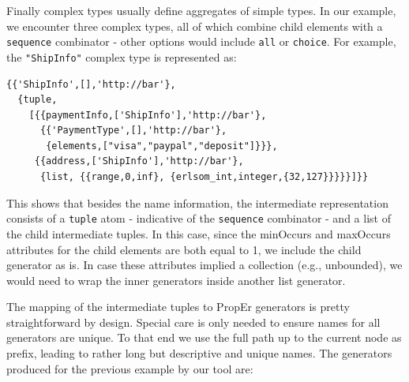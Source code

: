 \documentclass[submission,copyright]{eptcs}
\begin{document}
Finally complex types usually define aggregates of simple types. In
our example, we encounter three complex types, all of which combine
child elements with a \texttt{sequence} combinator - other options
would include \texttt{all} or \texttt{choice}. For example, the
\texttt{"ShipInfo"} complex type is represented as:

\begin{lstlisting}
{{'ShipInfo',[],'http://bar'},
  {tuple,
    [{{paymentInfo,['ShipInfo'],'http://bar'},
      {{'PaymentType',[],'http://bar'},
       {elements,["visa","paypal","deposit"]}}},
     {{address,['ShipInfo'],'http://bar'},
      {list, {{range,0,inf}, {erlsom_int,integer,{32,127}}}}}]}}
\end{lstlisting}

This shows that besides the name information, the intermediate representation consists of a 
\texttt{tuple} atom - indicative of the \texttt{sequence} combinator - and a list of the 
child intermediate tuples. In this case, since the minOccurs and maxOccurs attributes for 
the child elements are both equal to 1, we include the child generator as is. In case these
attributes implied a collection (e.g., unbounded), we would need to wrap the inner generators 
inside another list generator.


The mapping of the intermediate tuples to PropEr generators is pretty straightforward by design. 
Special care is only needed to ensure names for all generators are unique. To that end we use 
the full path up to the current node as prefix, leading to rather long but descriptive and unique 
names. The generators produced for the previous example by our tool are:
\end{document}
